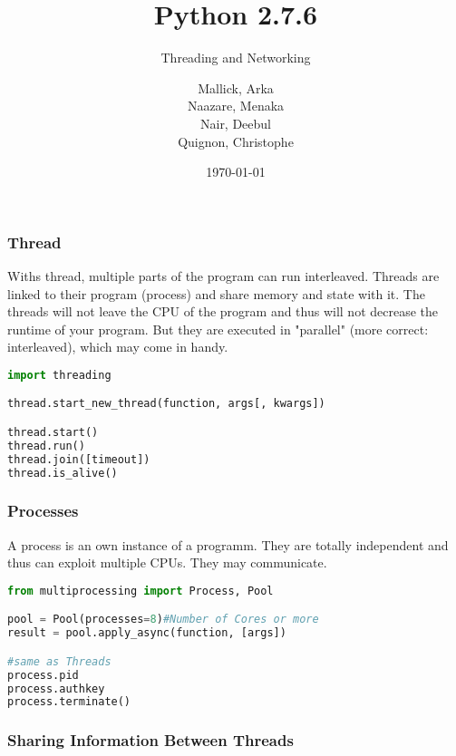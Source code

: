 \documentclass{beamer}
\begin{document}
\title{Python 2.7.6}
\subtitle{Threading and Networking}
\author{
  Mallick, Arka\\
  Naazare, Menaka \\
  Nair, Deebul\\
  Quignon, Christophe \\
} 
\date{\today}

\begin{frame}
\titlepage
\end{frame}

\begin{frame}[fragile]
\frametitle{Thread}
Withs thread, multiple parts of the program can run interleaved. Threads are linked to their program (process) and share memory and state with it.
The threads will not leave the CPU of the program and thus will not decrease the runtime of your program. But they are executed in "parallel" (more correct: interleaved), which may come in handy.


\begin{lstlisting}[language=Python]
import threading

thread.start_new_thread(function, args[, kwargs])

thread.start()
thread.run()
thread.join([timeout])
thread.is_alive()
\end{lstlisting}
\end{frame}

\begin{frame}[fragile]
\frametitle{Processes}
A process is an own instance of a programm. They are totally independent and thus can exploit multiple CPUs. They may communicate. 

\begin{lstlisting}[language=Python]
from multiprocessing import Process, Pool

pool = Pool(processes=8)#Number of Cores or more
result = pool.apply_async(function, [args])

#same as Threads
process.pid
process.authkey
process.terminate()
\end{lstlisting}
\end{frame}


\begin{frame}[fragile]
\frametitle{Sharing Information Between Threads}

\end{frame}
\end{document}
